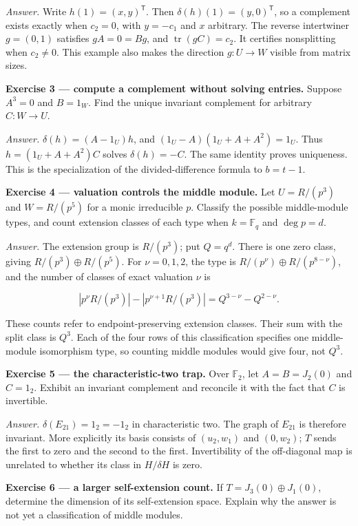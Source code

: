 \documentclass[
  11pt,
]{article}
\begin{document}
\emph{Answer.} Write \(h(1)=(x,y)^{\mathsf T}\). Then
\(\delta(h)(1)=(y,0)^{\mathsf T}\), so a complement exists exactly when
\(c_2=0\), with \(y=-c_1\) and \(x\) arbitrary. The reverse intertwiner
\(g=(0,1)\) satisfies \(gA=0=Bg\), and \(\operatorname{tr}(gC)=c_2\). It
certifies nonsplitting when \(c_2\ne0\). This example also makes the
direction \(g:U\to W\) visible from matrix sizes.

\textbf{Exercise 3 --- compute a complement without solving entries.}
Suppose \(A^3=0\) and \(B=1_W\). Find the unique invariant complement
for arbitrary \(C:W\to U\).

\emph{Answer.} \(\delta(h)=(A-1_U)h\), and \((1_U-A)(1_U+A+A^2)=1_U\).
Thus \(h=(1_U+A+A^2)C\) solves \(\delta(h)=-C\). The same identity
proves uniqueness. This is the specialization of the divided-difference
formula to \(b=t-1\).

\textbf{Exercise 4 --- valuation controls the middle module.} Let
\(U=R/(p^3)\) and \(W=R/(p^5)\) for a monic irreducible \(p\). Classify
the possible middle-module types, and count extension classes of each
type when \(k=\mathbb F_q\) and \(\deg p=d\).

\emph{Answer.} The extension group is \(R/(p^3)\); put \(Q=q^d\). There
is one zero class, giving \(R/(p^3)\oplus R/(p^5)\). For \(\nu=0,1,2\),
the type is \(R/(p^\nu)\oplus R/(p^{8-\nu})\), and the number of classes
of exact valuation \(\nu\) is

\[|p^\nu R/(p^3)|-|p^{\nu+1}R/(p^3)|
=Q^{3-\nu}-Q^{2-\nu}.\]

These counts refer to endpoint-preserving extension classes. Their sum
with the split class is \(Q^3\). Each of the four rows of this
classification specifies one middle-module isomorphism type, so counting
middle modules would give four, not \(Q^3\).

\textbf{Exercise 5 --- the characteristic-two trap.} Over
\(\mathbb F_2\), let \(A=B=J_2(0)\) and \(C=1_2\). Exhibit an invariant
complement and reconcile it with the fact that \(C\) is invertible.

\emph{Answer.} \(\delta(E_{21})=1_2=-1_2\) in characteristic two. The
graph of \(E_{21}\) is therefore invariant. More explicitly its basis
consists of \((u_2,w_1)\) and \((0,w_2)\); \(T\) sends the first to zero
and the second to the first. Invertibility of the off-diagonal map is
unrelated to whether its class in \(H/\delta H\) is zero.

\textbf{Exercise 6 --- a larger self-extension count.} If
\(T=J_3(0)\oplus J_1(0)\), determine the dimension of its self-extension
space. Explain why the answer is not yet a classification of middle
modules.
\end{document}
